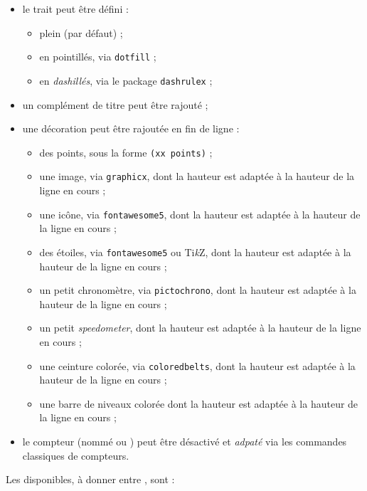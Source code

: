 \documentclass[french,11pt,a4paper]{article}
\providecommand\tikzlogo{Ti\textit{k}Z}
\let\TikZ\tikzlogo
\begin{document}
\begin{itemize}
	\item le trait peut être défini :
	\begin{itemize}
		\item plein (par défaut) ;
		\item en pointillés, via \texttt{dotfill} ;
		\item en \textit{dashillés}, via le package \texttt{dashrulex} ;
	\end{itemize}
	\item un complément de titre peut être rajouté ;
	\item une décoration peut être rajoutée en fin de ligne :
	\begin{itemize}
		\item des points, sous la forme \texttt{(xx points)} ;
		\item une image, via \texttt{graphicx}, dont la hauteur est adaptée à la hauteur de la ligne en cours ;
		\item une icône, via \texttt{fontawesome5}, dont la hauteur est adaptée à la hauteur de la ligne en cours ;
		\item des étoiles, via \texttt{fontawesome5} ou \TikZ, dont la hauteur est adaptée à la hauteur de la ligne en cours ;
		\item un petit chronomètre, via \texttt{pictochrono}, dont la hauteur est adaptée à la hauteur de la ligne en cours ;
		\item un petit \textit{speedometer}, dont la hauteur est adaptée à la hauteur de la ligne en cours ;
		\item une ceinture colorée, via \texttt{coloredbelts}, dont la hauteur est adaptée à la hauteur de la ligne en cours ;
		\item une barre de niveaux colorée dont la hauteur est adaptée à la hauteur de la ligne en cours ;
	\end{itemize}
	\item le compteur (nommé  ou ) peut être désactivé et \textit{adpaté} via les commandes classiques de compteurs.
\end{itemize}

Les  disponibles, à donner entre \MontreCode{[...]}, sont :
\end{document}

